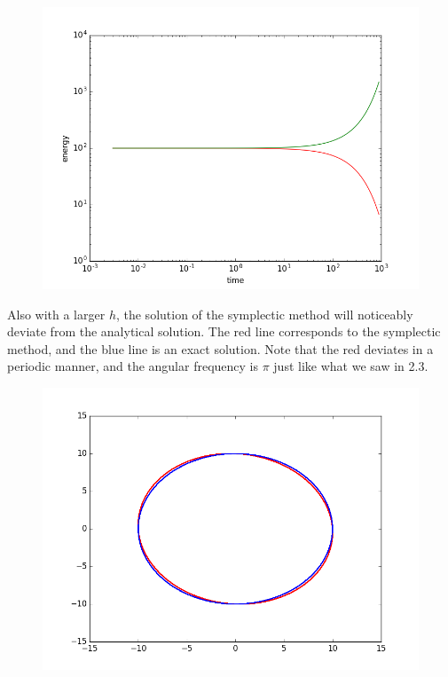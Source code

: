 \documentclass[10pt]{article}
\begin{document}
\begin{figure}[!h]
\centering
\includegraphics[scale=0.5]{w3fig17.png}
\end{figure}
\newpage
Also with a larger $h$, the solution of the symplectic method will noticeably deviate from the analytical solution. The red line corresponds to the symplectic method, and the blue line is an exact solution. Note that the red deviates in a periodic manner, and the angular frequency is $\pi$ just like what we saw in 2.3.\\
\begin{figure}[!h]
\centering
\includegraphics[scale=0.5]{w3fig16.png}
\end{figure}
\end{document}
